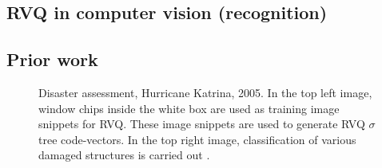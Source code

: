 


\begin{FrontMatter}
\contents %
\end{FrontMatter}
\begin{Body}

\chapter{RVQ in computer vision (recognition)}
\label{chap_RVQ_CV_recog}	
%

\section{Prior work}
\label{Sec:RVQ_prior_work}	
\begin{figure}[htp]	
\centering	
{}
\caption{Disaster assessment, Hurricane Katrina, 2005.  In the top left image, window chips inside the white box are used as training image snippets for RVQ.  These image snippets are used to generate RVQ $\sigma$ tree code-vectors.  In the top right image, classification of various damaged structures is carried out \cite{2007_JNL_Katrina_Barnes}.}
\end{figure}


\end{Body}
